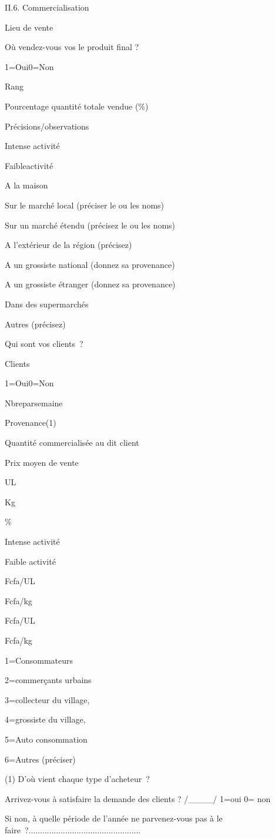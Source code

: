 \documentclass[12pt,oneside]{report}
\begin{document}
II.6. Commercialisation

Lieu de vente

Où vendez-vous vos le produit final ?

1=Oui0=Non

Rang

Pourcentage quantité totale vendue (\%)

Précisions/observations

Intense activité

Faibleactivité

A la maison

Sur le marché local (préciser le ou les noms)

Sur un marché étendu (précisez le ou les noms)

A l’extérieur de la région (précisez)

A un grossiste national (donnez sa provenance)

A un grossiste étranger (donnez sa provenance)

Dans des supermarchés

Autres (précisez)

Qui sont vos clients ?

Clients

1=Oui0=Non

Nbreparsemaine

Provenance(1)

Quantité commercialisée au dit client

Prix moyen de vente

UL

Kg

\%

Intense activité

Faible activité

Fcfa/UL

Fcfa/kg

Fcfa/UL

Fcfa/kg

1=Consommateurs

2=commerçants urbains

3=collecteur du village,

4=grossiste du village,

5=Auto consommation

6=Autres (préciser)

(1) D’où vient chaque type d’acheteur ?

Arrivez-vous à satisfaire la demande des clients ?  /\_\_\_\_/ 1=oui 0= non

Si non, à quelle période de l’année ne parvenez-vous pas à le faire ?.................................................
\end{document}
